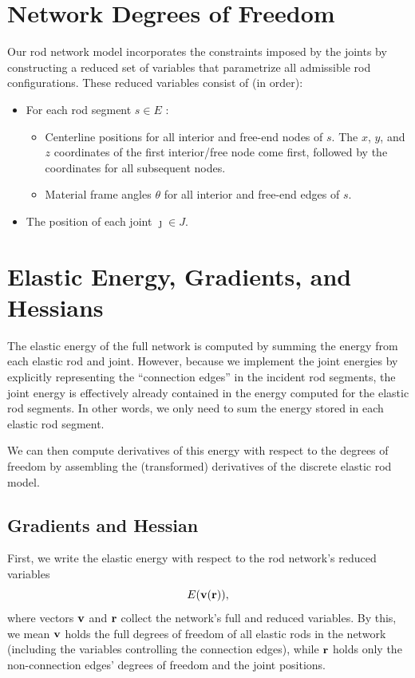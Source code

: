 \documentclass[10pt]{article}
\renewcommand{\vec}[1]{{\bf #1}}
\def\r{\vec{r}}
\def\v{\vec{v}}
\def\segment{s}
\def\joint{\jmath}
\begin{document}
\section{Network Degrees of Freedom}
Our rod network model incorporates the constraints imposed by the joints by
constructing a reduced set of variables that parametrize all
admissible rod configurations. These reduced variables consist of (in order):
\begin{itemize}
    \item For each rod segment $\segment \in E$ :
    \begin{itemize}
        \item Centerline positions for all interior and free-end nodes of $s$.
            The $x$, $y$, and $z$ coordinates of the first interior/free node
            come first, followed by the coordinates for all subsequent
            nodes.
        \item Material frame angles $\theta$ for all interior and free-end edges of
              $\segment$.
    \end{itemize}
    \item The position of each joint $\joint \in J$.
\end{itemize}

\section{Elastic Energy, Gradients, and Hessians}
The elastic energy of the full network is computed by summing the energy from
each elastic rod and joint. However, because we implement the joint
energies by explicitly representing the ``connection edges'' in
the incident rod segments, the joint energy is effectively already contained in
the energy computed for the elastic rod segments. In other words, we only need
to sum the energy stored in each elastic rod segment.

We can then compute derivatives of this energy with respect to the degrees of
freedom by assembling the (transformed) derivatives of the discrete elastic rod
model.

\subsection{Gradients and Hessian}
First, we write the elastic energy with respect to the rod network's reduced variables
$$
E(\v(\r)),
$$
where vectors $\v$ and $\r$ collect the network's full and reduced variables.
By this, we mean $\v$ holds the full degrees of freedom of all elastic rods in
the network (including the variables controlling the connection edges), while
$\r$ holds only the non-connection edges' degrees of freedom and the joint
positions.
\end{document}
